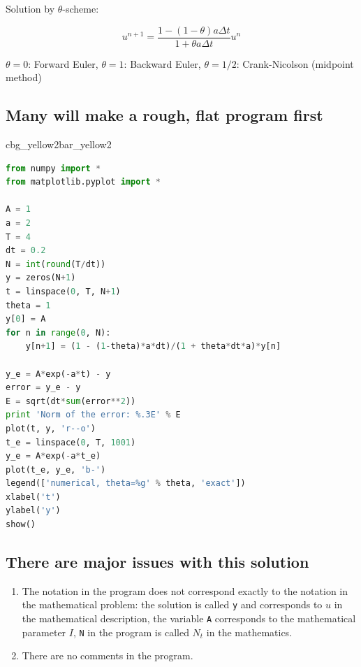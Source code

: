 \documentclass[%
oneside,                 %
final,                   %
10pt]{article}
\newenvironment{_pro_tight}[2]{
   \def\FrameCommand{\color{#2}\vrule width 1mm\normalcolor\colorbox{#1}}
   \FrameRule0.6pt\MakeFramed {\advance\hsize-2mm\FrameRestore}\vskip3mm}
   {\vskip0mm\endMakeFramed}
\newenvironment{pro}[2]{
\bgroup\rmfamily
\fboxsep=0mm\relax
\begin{_pro_tight}{#1}{#2}
\list{}{\parsep=-2mm\parskip=0mm\topsep=0pt\leftmargin=2mm
\rightmargin=2\leftmargin\leftmargin=4pt\relax}
\item\relax}
{\endlist\end{_pro_tight}\egroup}
\begin{document}
Solution by $\theta$-scheme:

\begin{equation*}
u^{n+1} = \frac{1 - (1-\theta) a\Delta t}{1 + \theta a\Delta t}u^n
\end{equation*}

$\theta =0$: Forward Euler, $\theta =1$: Backward Euler, $\theta =1/2$: Crank-Nicolson (midpoint method)

\subsection*{Many will make a rough, flat program first}

\begin{pro}{cbg_yellow2}{bar_yellow2}\begin{lstlisting}[language=Python,style=simple,xleftmargin=2mm]
from numpy import *
from matplotlib.pyplot import *

A = 1
a = 2
T = 4
dt = 0.2
N = int(round(T/dt))
y = zeros(N+1)
t = linspace(0, T, N+1)
theta = 1
y[0] = A
for n in range(0, N):
    y[n+1] = (1 - (1-theta)*a*dt)/(1 + theta*dt*a)*y[n]

y_e = A*exp(-a*t) - y
error = y_e - y
E = sqrt(dt*sum(error**2))
print 'Norm of the error: %.3E' % E
plot(t, y, 'r--o')
t_e = linspace(0, T, 1001)
y_e = A*exp(-a*t_e)
plot(t_e, y_e, 'b-')
legend(['numerical, theta=%g' % theta, 'exact'])
xlabel('t')
ylabel('y')
show()
\end{lstlisting}\end{pro}
\noindent


\subsection*{There are major issues with this solution}

\begin{enumerate}
\item The notation in the program does not correspond exactly to
   the notation in the mathematical problem: the solution is called
   \texttt{y} and corresponds to $u$ in the mathematical description,
   the variable \texttt{A} corresponds to the mathematical parameter $I$,
   \texttt{N} in the program is called $N_t$ in the mathematics.

\item There are no comments in the program.
\end{enumerate}

\noindent
\end{document}
